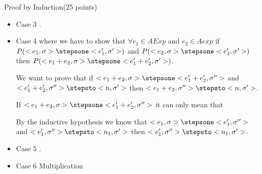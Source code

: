 \documentclass{article}
\begin{document}
\begin{question}{Proof by Induction}{(25 points)}
\begin{subquestion}
\begin{itemize}
Putting together the two small step semantics rules $<e, \sigma> \stepsone <x, \sigma'>$ and $<x, \sigma'> \stepsto <n, \sigma'>$ implies that $<e, \sigma> \stepsone^* <n, \sigma'>)$ and given that $<n, \sigma'>$ is a final configuration we conclude that $<e, \sigma> \stepsto <n, \sigma'>)$.

\item Case 3 .

\item Case 4 where we have to show that $\forall e_1 \in AExp$ and $e_2 \in Aexp$ if $P(<e_1, \sigma> \stepsone <e_1', \sigma'>)$ and $P(<e_2, \sigma> \stepsone <e_2', \sigma'>)$ then $P(<e_1+e_2, \sigma> \stepsone <e_1'+e_2', \sigma'>)$.

We want to prove that if $<e_1+e_2, \sigma> \stepsone <e_1'+e_2', \sigma''>$ and $<e_1'+e_2', \sigma''> \stepsto <n, \sigma'>$ then $<e_1+e_2, \sigma''> \stepsto <n, \sigma'>$.

If $<e_1+e_2, \sigma> \stepsone <e_1'+e_2', \sigma''>$ it can only mean that 

By the inductive hypothesis we know that $<e_1, \sigma> \stepsone <e_1', \sigma''>$ and $<e_1', \sigma''> \stepsto <n_1, \sigma'>$ then $<e_1', \sigma''> \stepsto <n_1, \sigma'>$.

\item Case 5 .

\item Case 6 Multiplication 

\end{itemize}
    
  \end{subquestion}

\end{question}





%
%
%
\end{document}

